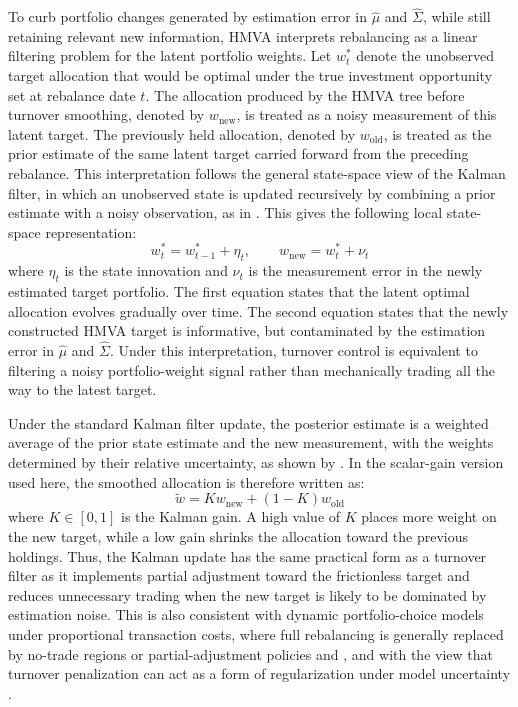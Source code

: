\documentclass[12pt]{article}
\begin{document}
To curb portfolio changes generated by estimation error in $\hat{\mu}$ and $\hat{\Sigma}$, while still retaining relevant new information, HMVA interprets rebalancing as a linear filtering problem for the latent portfolio weights. Let $w_t^{\ast}$ denote the unobserved target allocation that would be optimal under the true investment opportunity set at rebalance date $t$. The allocation produced by the HMVA tree before turnover smoothing, denoted by $w_{\mathrm{new}}$, is treated as a noisy measurement of this latent target. The previously held allocation, denoted by $w_{\mathrm{old}}$, is treated as the prior estimate of the same latent target carried forward from the preceding rebalance. This interpretation follows the general state-space view of the Kalman filter, in which an unobserved state is updated recursively by combining a prior estimate with a noisy observation, as in \cite{kalman1960}. This gives the following local state-space representation:
\begin{equation}
w_t^{\ast} = w_{t-1}^{\ast} + \eta_t, 
\qquad
w_{\mathrm{new}} = w_t^{\ast} + \nu_t
\label{eq:state_innov} 
\end{equation}
where $\eta_t$ is the state innovation and $\nu_t$ is the measurement error in the newly estimated target portfolio. The first equation states that the latent optimal allocation evolves gradually over time. The second equation states that the newly constructed HMVA target is informative, but contaminated by the estimation error in $\hat{\mu}$ and $\hat{\Sigma}$. Under this interpretation, turnover control is equivalent to filtering a noisy portfolio-weight signal rather than mechanically trading all the way to the latest target.

Under the standard Kalman filter update, the posterior estimate is a weighted average of the prior state estimate and the new measurement, with the weights determined by their relative uncertainty, as shown by \cite{kalman1960}. In the scalar-gain version used here, the smoothed allocation is therefore written as:
\begin{equation}
\tilde{w} = K w_{\mathrm{new}} + (1-K) w_{\mathrm{old}} \label{eq:kalman_update}
\end{equation}
where $K \in [0,1]$ is the Kalman gain. A high value of $K$ places more weight on the new target, while a low gain shrinks the allocation toward the previous holdings. Thus, the Kalman update has the same practical form as a turnover filter as it implements partial adjustment toward the frictionless target and reduces unnecessary trading when the new target is likely to be dominated by estimation noise. This is also consistent with dynamic portfolio-choice models under proportional transaction costs, where full rebalancing is generally replaced by no-trade regions or partial-adjustment policies \cite{constantinides1986} and \cite{demiguelmei2016}, and with the view that turnover penalization can act as a form of regularization under model uncertainty \cite{hautschvoigt2019}.
\end{document}
